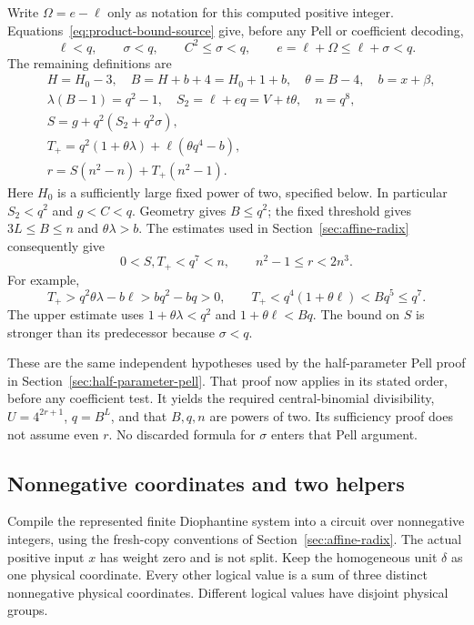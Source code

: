 Write $\Omega=e-\ell$ only as notation for this computed positive
integer. Equations~\eqref{eq:product-bound-source} give, before any
Pell or coefficient decoding,
\begin{equation}\label{eq:product-bound-ranges}
 \ell<q,\qquad \sigma<q,\qquad
 C^2\le\sigma<q,\qquad
 e=\ell+\Omega\le\ell+\sigma<q.
\end{equation}
The remaining definitions are
\begin{equation}\label{eq:product-bound-packing}
\begin{aligned}
 &H=H_0-3,\quad B=H+b+4=H_0+1+b,\quad
   \theta=B-4,\quad b=x+\beta,\\
 &\lambda(B-1)=q^2-1,\quad
   S_2=\ell+eq=V+t\theta,\quad n=q^8,\\
 &S=g+q^2(S_2+q^2\sigma),\\
 &T_+=q^2(1+\theta\lambda)+\ell(\theta q^4-b),\\
 &r=S(n^2-n)+T_+(n^2-1).
\end{aligned}
\end{equation}
Here $H_0$ is a sufficiently large fixed power of two, specified below.
In particular $S_2<q^2$ and $g<C<q$. Geometry gives $B\le q^2$;
the fixed threshold gives $3L\le B\le n$ and $\theta\lambda>b$.
The estimates used in Section~\ref{sec:affine-radix} consequently give
\begin{equation}\label{eq:product-bound-pre-pell}
 0<S,T_+<q^7<n,\qquad n^2-1\le r<2n^3.
\end{equation}
For example,
\[
 T_+>q^2\theta\lambda-b\ell>bq^2-bq>0,
 \qquad
 T_+<q^4(1+\theta\ell)<Bq^5\le q^7.
\]
The upper estimate uses $1+\theta\lambda<q^2$ and
$1+\theta\ell<Bq$. The bound on $S$ is stronger than its predecessor
because $\sigma<q$.

These are the same independent hypotheses used by the half-parameter
Pell proof in Section~\ref{sec:half-parameter-pell}. That proof now
applies in its stated order, before any coefficient test. It yields
the required central-binomial divisibility, $U=4^{2r+1}$, $q=B^L$,
and that $B,q,n$ are powers of two. Its sufficiency proof does not
assume even $r$. No discarded formula for $\sigma$ enters that Pell
argument.

\subsection{Nonnegative coordinates and two helpers}

Compile the represented finite Diophantine system into a circuit over
nonnegative integers, using the fresh-copy conventions of
Section~\ref{sec:affine-radix}. The actual positive input $x$ has
weight zero and is not split. Keep the homogeneous unit $\delta$ as
one physical coordinate. Every other logical value is a sum of three
distinct nonnegative physical coordinates. Different logical values
have disjoint physical groups.

